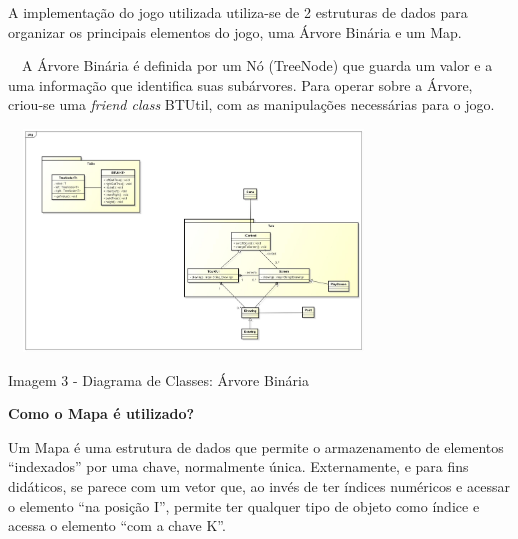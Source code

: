 \documentclass[a4paper]{article}
\begin{document}
{\color{black}
A implementação do jogo utilizada utiliza-se de 2 estruturas de dados
para organizar os principais elementos do jogo, uma Árvore Binária e um
Map.}


\bigskip


\bigskip


{\color{black}
\ \ A Árvore Binária é definida por um Nó (TreeNode) que guarda um valor
e a uma informação que identifica suas subárvores. Para operar sobre a
Árvore, criou-se uma \textit{friend class} BTUtil, com as manipulações
necessárias para o jogo.}



\begin{center}
\includegraphics[width=3.8646in,height=2.3228in]{UFSCar20Summer20Tour-img/UFSCar20Summer20Tour-img4.jpg}
\end{center}

\bigskip


\bigskip


\bigskip


\bigskip


\bigskip


\bigskip


\bigskip


\bigskip


\bigskip


\bigskip


\bigskip

{\centering\color{black}
Imagem 3 - Diagrama de Classes: Árvore Binária
\par}


\bigskip


\bigskip

{\color{black}
\textbf{Como o Mapa é utilizado?}}

{\color{black}
Um Mapa é uma estrutura de dados que permite o armazenamento de
elementos “indexados” por uma chave, normalmente única. Externamente, e
para fins didáticos, se parece com um vetor que, ao invés de ter
índices numéricos e acessar o elemento “na posição I”, permite ter
qualquer tipo de objeto como índice e acessa o elemento “com a chave
K”.}
\end{document}
